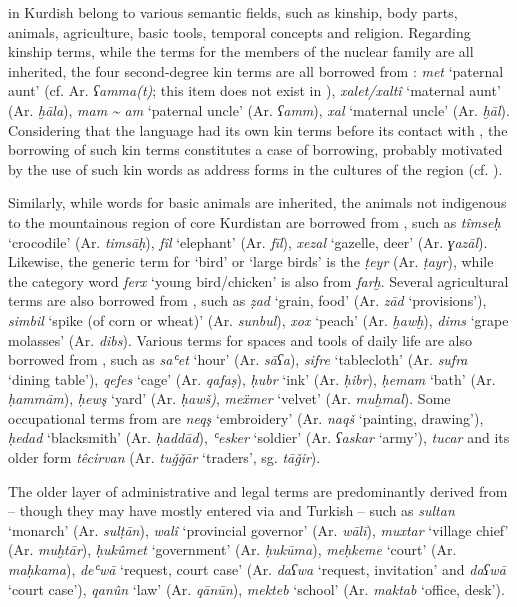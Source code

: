 \documentclass[output=paper]{langsci/langscibook}
\begin{document}
  in Kurdish belong to various semantic fields, such as kinship, body parts, animals, agriculture, basic tools, temporal concepts and religion. Regarding kinship terms, while the terms for the members of the nuclear family are all inherited, the four second-degree kin terms are all borrowed from : \textit{met} ‘paternal aunt’ (cf. Ar. \textit{ʕamma(t)}; this item does not exist in ), \textit{xalet/xaltî} ‘maternal aunt’ (Ar. \textit{ḫāla}), \textit{mam} \textit{{\textasciitilde} am} ‘paternal uncle’ (Ar. \textit{ʕamm}), \textit{xal} ‘maternal uncle’ (Ar. \textit{ḫāl}). Considering that the language had its own kin terms before its contact with , the borrowing of such kin terms constitutes a case of  borrowing, probably motivated by the use of such kin words as address forms in the cultures of the region (cf. \citealt{HaigÖpengin2015}).

Similarly, while words for basic animals are inherited, the animals not indigenous to the mountainous region of core Kurdistan are borrowed from , such as \textit{tîmseḥ} ‘crocodile’ (Ar. \textit{timsāḥ}), \textit{fîl} ‘elephant’ (Ar. \textit{fīl}), \textit{xezal} ‘gazelle, deer’ (Ar. \textit{ɣazāl}). Likewise, the generic term for ‘bird’ or ‘large birds’ is the   \textit{ṭeyr} (Ar. \textit{ṭayr}), while the category word \textit{ferx} ‘young bird/chicken’ is also from  \textit{farḫ}. Several agricultural terms are also borrowed from , such as \textit{ẓad} ‘grain, food’ (Ar. \textit{zād} `provisions'), \textit{simbil} ‘spike (of corn or wheat)’ (Ar. \textit{sunbul}), \textit{xox} ‘peach’ (Ar. \textit{ḫawḫ}), \textit{dims} ‘grape molasses’ (Ar. \textit{dibs}). Various terms for spaces and tools of daily life are also borrowed from , such as \textit{saʿet} ‘hour’ (Ar. \textit{sāʕa}), \textit{sifre} ‘tablecloth’ (Ar. \textit{sufra} ‘dining table’), \textit{qefes} ‘cage’ (Ar. \textit{qafaṣ}), \textit{ḥubr} ‘ink’ (Ar. \textit{ḥibr}), \textit{ḥemam} ‘bath’ (Ar. \textit{ḥammām}), \textit{ḥewş} ‘yard’ (Ar. \textit{ḥawš)}, \textit{meẍmer} ‘velvet’ (Ar. \textit{muḫmal}). Some occupational terms from  are \textit{neqş} ‘embroidery’ (Ar. \textit{naqš} ‘painting, drawing’), \textit{ḥedad} ‘blacksmith’ (Ar. \textit{ḥaddād}), \textit{ʿesker} ‘soldier’ (Ar. \textit{ʕaskar} ‘army’), \textit{tucar} and its older form \textit{têcirvan} (Ar. \textit{tuǧǧār} ‘traders’, sg. \textit{tāǧir}).  

The older layer of administrative and legal terms are predominantly derived from  – though they may have mostly entered via  and  {Turkish} – such as \textit{sultan} ‘monarch’ (Ar. \textit{sulṭān}), \textit{walî} ‘provincial governor’ (Ar. \textit{wālī}), \textit{muxtar} ‘village chief’ (Ar. \textit{muḫtār}), \textit{ḥukûmet} ‘government’ (Ar. \textit{ḥukūma}), \textit{meḥkeme} ‘court’ (Ar. \textit{maḥkama}), \textit{deʿwā} ‘request, court case’ (Ar. \textit{daʕwa} ‘request, invitation’ and \textit{daʕwā} ‘court case’), \textit{qanûn} ‘law’ (Ar. \textit{qānūn}), \textit{mekteb} ‘school’ (Ar. \textit{maktab} ‘office, desk’).  
\end{document}
